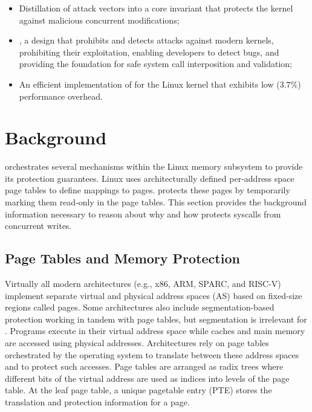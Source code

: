 \documentclass[letterpaper,twocolumn,10pt]{article}
\begin{document}
\begin{itemize}[noitemsep]
\item Distillation of \tocttou attack vectors into a core invariant that protects
the kernel against malicious concurrent modifications;
\item \tiktok, a design that prohibits and detects
\tocttou attacks against modern kernels, prohibiting their exploitation,
enabling developers to detect \tocttou bugs, and providing the foundation for
safe system call interposition and validation;
\item An efficient implementation of \tiktok for the Linux kernel that exhibits
low ($3.7\%$) performance overhead.
\end{itemize}


\section{Background}

\tiktok orchestrates several mechanisms within the Linux memory subsystem 
to provide its protection guarantees.
Linux uses architecturally defined per-address space page tables to define
mappings to pages.
\tiktok protects these pages by temporarily marking them read-only in the 
page tables.
This section provides the background information necessary to reason about 
why and how \tiktok protects syscalls from concurrent writes.


\subsection{Page Tables and Memory Protection}

Virtually all modern architectures (e.g., x86, ARM, SPARC, and 
RISC-V) implement separate virtual and physical
address spaces (AS) based on fixed-size regions called pages.
%
Some architectures also include segmentation-based protection 
working in tandem with page tables, but segmentation is irrelevant for \tiktok.
%
Programs execute in their virtual address space while caches and main memory
are accessed using physical addresses.
Architectures rely on page tables orchestrated by the operating system 
to translate between these address spaces and to protect such accesses.
Page tables are arranged as radix trees where different bits of the 
virtual address are used as indices into levels of the page table.
At the leaf page table, a unique pagetable entry (PTE) stores the 
translation and protection information for a page.
\end{document}
